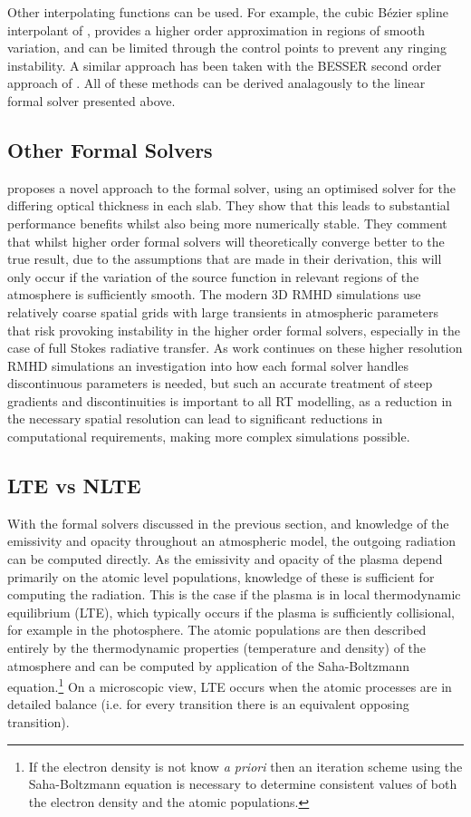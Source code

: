 Other interpolating functions can be used. For example, the cubic Bézier spline interpolant of \citet{DelaCruzRodriguez2013}, provides a higher order approximation in regions of smooth variation, and can be limited through the control points to prevent any ringing instability. A similar approach has been taken with the BESSER second order approach of \citet{Stepan2013}.
All of these methods can be derived analagously to the linear formal solver presented above.

\subsection{Other Formal Solvers}

\citet{Janett2018} proposes a novel approach to the formal solver,  using an optimised solver for the differing optical thickness in each slab. They show that this leads to substantial performance benefits whilst also being more numerically stable. They comment that whilst higher order formal solvers will theoretically converge better to the true result, due to the assumptions that are made in their derivation, this will only occur if the variation of the source function in relevant regions of the atmosphere is sufficiently smooth. The modern 3D RMHD simulations use relatively coarse spatial grids with large transients in atmospheric parameters that risk provoking instability in the higher order formal solvers, especially in the case of full Stokes radiative transfer.
As work continues on these higher resolution RMHD simulations an investigation into how each formal solver handles discontinuous parameters is needed, but such an accurate treatment of steep gradients and discontinuities is important to all RT modelling, as a reduction in the necessary spatial resolution can lead to significant reductions in computational requirements, making more complex simulations possible.


\subsection{LTE vs NLTE}

With the formal solvers discussed in the previous section, and knowledge of the emissivity and opacity throughout an atmospheric model, the outgoing radiation can be computed directly. As the emissivity and opacity of the plasma depend primarily on the atomic level populations, knowledge of these is sufficient for computing the radiation.
This is the case if the plasma is in local thermodynamic equilibrium (LTE), which typically occurs if the plasma is sufficiently collisional, for example in the photosphere. The atomic populations are then described entirely by the thermodynamic properties (temperature and density) of the atmosphere and can be computed by application of the Saha-Boltzmann equation.\footnote{If the electron density is not know \textit{a priori} then an iteration scheme using the Saha-Boltzmann equation is necessary to determine consistent values of both the electron density and the atomic populations.} On a microscopic view, LTE occurs when the atomic processes are in detailed balance (i.e. for every transition there is an equivalent opposing transition).

